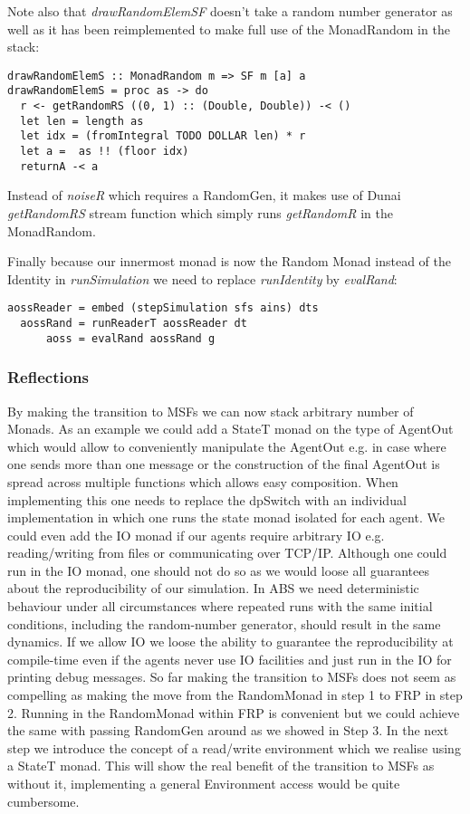 Note also that \textit{drawRandomElemSF} doesn't take a random number generator as well as it has been reimplemented to make full use of the MonadRandom in the stack:

\begin{verbatim}
drawRandomElemS :: MonadRandom m => SF m [a] a
drawRandomElemS = proc as -> do
  r <- getRandomRS ((0, 1) :: (Double, Double)) -< ()
  let len = length as
  let idx = (fromIntegral TODO DOLLAR len) * r
  let a =  as !! (floor idx)
  returnA -< a
\end{verbatim}

Instead of \textit{noiseR} which requires a RandomGen, it makes use of Dunai \textit{getRandomRS} stream function which simply runs \textit{getRandomR} in the MonadRandom.

Finally because our innermost monad is now the Random Monad instead of the Identity in \textit{runSimulation} we need to replace \textit{runIdentity} by \textit{evalRand}:

\begin{verbatim}
aossReader = embed (stepSimulation sfs ains) dts
  aossRand = runReaderT aossReader dt
      aoss = evalRand aossRand g
\end{verbatim}

\subsubsection{Reflections}
By making the transition to MSFs we can now stack arbitrary number of Monads. As an example we could add a StateT monad on the type of AgentOut which would allow to conveniently manipulate the AgentOut e.g. in case where one sends more than one message or the construction of the final AgentOut is spread across multiple functions which allows easy composition. When implementing this one needs to replace the dpSwitch with an individual implementation in which one runs the state monad isolated for each agent.
We could even add the IO monad if our agents require arbitrary IO e.g. reading/writing from files or communicating over TCP/IP. Although one could run in the IO monad, one should not do so as we would loose all guarantees about the reproducibility of our simulation. In ABS we need deterministic behaviour under all circumstances where repeated runs with the same initial conditions, including the random-number generator, should result in the same dynamics. If we allow IO we loose the ability to guarantee the reproducibility at compile-time even if the agents never use IO facilities and just run in the IO for printing debug messages.
So far making the transition to MSFs does not seem as compelling as making the move from the RandomMonad in step 1 to FRP in step 2. Running in the RandomMonad within FRP is convenient but we could achieve the same with passing RandomGen around as we showed in Step 3. In the next step we introduce the concept of a read/write environment which we realise using a StateT monad. This will show the real benefit of the transition to MSFs as without it, implementing a general Environment access would be quite cumbersome.